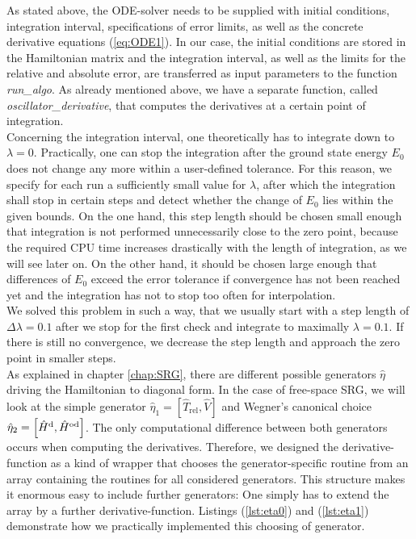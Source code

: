 As stated above, the ODE-solver needs to be supplied with initial conditions, integration interval, specifications of error limits, as well as the concrete derivative equations (\ref{eq:ODE1}). In our case, the initial conditions are stored in the Hamiltonian matrix and the integration interval, as well as the limits for the relative and absolute error, are transferred as input parameters to the function \textit{run\_algo}. As already mentioned above, we have a separate function, called \textit{oscillator\_derivative}, that computes the derivatives at a certain point of integration. \\
Concerning the integration interval, one theoretically has to integrate down to $\lambda=0$. Practically, one can stop the integration after the ground state energy $E_0$ does not change any more within a user-defined tolerance. For this reason, we specify for each run a sufficiently small value for $\lambda$, after which the integration shall stop in certain steps and detect whether the change of $E_0$ lies within the given bounds. On the one hand, this step length should be chosen small enough that integration is not performed unnecessarily close to the zero point, because the required CPU time increases drastically with the length of integration, as we will see later on. On the other hand, it should be chosen large enough that differences of $E_0$ exceed the error tolerance if convergence has not been reached yet and the integration has not to stop too often for interpolation. \\
We solved this problem in such a way, that we usually start with a step length of $\Delta\lambda=0.1$ after we stop for the first check and integrate to maximally $\lambda=0.1$. If there is still no convergence, we decrease the step length and approach the zero point in smaller steps.\\
As explained in chapter \ref{chap:SRG}, there are different possible generators $\hat{\eta}$ driving the Hamiltonian to  diagonal form. In the case of free-space SRG, we will look at the simple generator  $\hat{\eta}_1 = \left[ \hat{T}_{\text{rel}}, \hat{V}\right]$  and Wegner's canonical choice $\hat{\eta}_2 = \left[ \hat{H}^{\rm d}, \hat{H}^{\rm od} \right]$. The only computational difference between both generators occurs when computing the derivatives. Therefore, we designed  the derivative-function as a kind of wrapper that chooses the generator-specific routine from an array containing the routines for all considered generators. This structure makes it enormous easy to include further generators: One simply has to extend the array by a further derivative-function. Listings (\ref{lst:eta0}) and (\ref{lst:eta1}) demonstrate how we practically implemented this choosing of generator.

